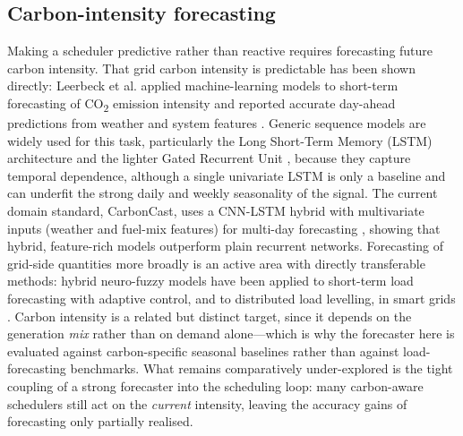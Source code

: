 \documentclass[12pt,a4paper]{article}
\begin{document}
\subsection{Carbon-intensity forecasting}
Making a scheduler predictive rather than reactive requires forecasting future carbon intensity. That grid
carbon intensity is predictable has been shown directly: Leerbeck et al. applied machine-learning models to
short-term forecasting of CO\textsubscript{2} emission intensity and reported accurate day-ahead predictions
from weather and system features \cite{leerbeck2020short}. Generic sequence models are widely used for this
task, particularly the Long Short-Term Memory (LSTM) architecture \cite{hochreiter1997long} and the lighter
Gated Recurrent Unit \cite{cho2014learning}, because they capture temporal dependence, although a single
univariate LSTM is only a baseline and can underfit the strong daily and weekly seasonality of the signal. The
current domain standard, CarbonCast, uses a CNN-LSTM hybrid with multivariate inputs (weather and fuel-mix
features) for multi-day forecasting \cite{maji2022carboncast}, showing that hybrid, feature-rich models
outperform plain recurrent networks. Forecasting of grid-side quantities more
broadly is an active area with directly transferable methods: hybrid neuro-fuzzy models have been applied to
short-term load forecasting with adaptive control, and to distributed load levelling, in smart grids
\cite{wang2024load, wang2024levelling}. Carbon intensity is a related but distinct target, since it depends on
the generation \emph{mix} rather than on demand alone---which is why the forecaster here is evaluated against
carbon-specific seasonal baselines rather than against load-forecasting benchmarks. What remains
comparatively under-explored is the tight coupling of a strong forecaster into the scheduling loop: many
carbon-aware schedulers still act on the \emph{current} intensity, leaving the accuracy gains of forecasting
only partially realised.
\end{document}
